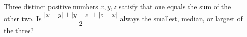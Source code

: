 Three distinct positive numbers $x,y,z$ satisfy that one equals the sum of the other two. Is $\dfrac{|x-y|+|y-z|+|z-x|}{2}$ always the smallest, median, or largest of the three?
